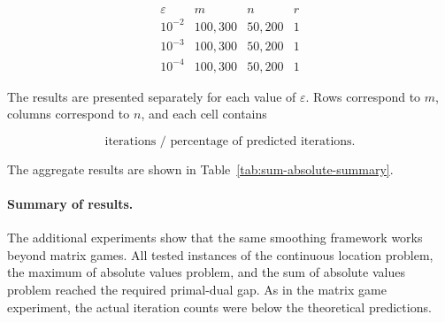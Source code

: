 \documentclass[11pt]{article}
\begin{document}
\[
\begin{array}{c|c|c|c}
\varepsilon & m & n & r\\
\hline
10^{-2} & 100,300 & 50,200 & 1\\
10^{-3} & 100,300 & 50,200 & 1\\
10^{-4} & 100,300 & 50,200 & 1
\end{array}
\]

The results are presented separately for each value of \(\varepsilon\). Rows
correspond to \(m\), columns correspond to \(n\), and each cell contains

\[
    \text{iterations / percentage of predicted iterations}.
\]

\begin{table}[H]
    \centering
    
    \caption{Sum of absolute values results for $\varepsilon=0.01$.
    Each cell shows iterations / percentage of predicted iterations.}
    \label{tab:sum-absolute-eps-001}
\end{table}

\begin{table}[H]
    \centering
    
    \caption{Sum of absolute values results for $\varepsilon=0.001$.
    Each cell shows iterations / percentage of predicted iterations.}
    \label{tab:sum-absolute-eps-0001}
\end{table}

\begin{table}[H]
    \centering
    
    \caption{Sum of absolute values results for $\varepsilon=0.0001$.
    Each cell shows iterations / percentage of predicted iterations.}
    \label{tab:sum-absolute-eps-00001}
\end{table}

The aggregate results are shown in Table~\ref{tab:sum-absolute-summary}.

\begin{table}[H]
    \centering
    
    \caption{Summary of sum of absolute values experiments.}
    \label{tab:sum-absolute-summary}
\end{table}


\paragraph{Summary of results.}
The additional experiments show that the same smoothing framework works beyond
matrix games. All tested instances of the continuous location problem, the
maximum of absolute values problem, and the sum of absolute values problem
reached the required primal-dual gap. As in the matrix game experiment, the
actual iteration counts were below the theoretical predictions.
\end{document}
